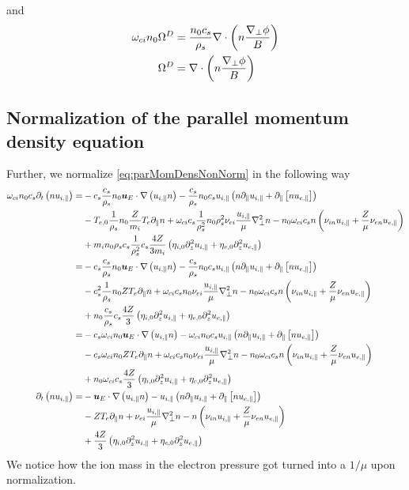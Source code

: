 %
and
%
\begin{align*}
    \omega_{ci}n_0\Omega^D &= \frac{n_0 c_s}{\rho_s}\nabla\cdot\left(n\frac{\nabla_\perp\phi}{B}\right)\\
    \Omega^D &= \nabla\cdot\left(n\frac{\nabla_\perp\phi}{B}\right)
\end{align*}
%

\subsection{Normalization of the parallel momentum density equation}
%
Further, we normalize \cref{eq:parMomDensNonNorm} in the following way
%
\begin{align*}
    \omega_{ci}n_0c_s \partial_t\left( n u_{i,\|}\right)
 =&
 - c_s\frac{c_s}{\rho_s}n_0
  \boldsymbol{u}_E \cdot \nabla\left( u_{i,\|} n \right)
 - \frac{c_s}{\rho_s}n_0c_s
    u_{i, \|}
    \left(
    n \partial_\| u_{i,\|}
    + \partial_\|\left[n u_{e,\|} \right]
    \right)   \\&
    - T_{e,0}\frac{1}{\rho_s}n_0
 \frac{Z}{m_i} T_e \partial_\| n
 + \omega_{ci}c_s\frac{1}{\rho_s^2}n_0\rho_s^2
 \nu_{ei} \frac{u_{i,\|}}{\mu} \nabla_\perp^2 n
 - n_0\omega_{ci}c_s
 n \left(\nu_{i n}u_{i,\|} + \frac{Z}{\mu} \nu_{e n}u_{e,\|}\right)
   \\&
   + m_in_0\rho_sc_s\frac{1}{\rho_s^2}c_s \frac{4Z}{3m_i}\left(
   \eta_{i,0} \partial_z^2 u_{i,\|}
 + \eta_{e,0}\partial_z^2 u_{e,\|}
 \right)
 \\
 =&
 - c_s\frac{c_s}{\rho_s}n_0
  \boldsymbol{u}_E \cdot \nabla\left( u_{i,\|} n \right)
 - \frac{c_s}{\rho_s}n_0c_s
  u_{i, \|}
    \left(
    n \partial_\| u_{i,\|}
    + \partial_\|\left[n u_{e,\|} \right]
    \right)
   \\&
 - c_s^2\frac{1}{\rho_s}n_0
 ZT_e \partial_\| n
 + \omega_{ci}c_sn_0
 \nu_{ei} \frac{u_{i,\|}}{\mu} \nabla_\perp^2 n
 - n_0\omega_{ci}c_s
 n \left(\nu_{i n}u_{i,\|} + \frac{Z}{\mu} \nu_{e n}u_{e,\|}\right)
   \\&
   + n_0\frac{c_s}{\rho_s}c_s\frac{4Z}{3}\left(
   \eta_{i,0} \partial_z^2 u_{i,\|}
 + \eta_{e,0}\partial_z^2 u_{e,\|}
 \right)
 \\
 =&
 - c_s\omega_{ci}n_0
  \boldsymbol{u}_E \cdot \nabla\left( u_{i,\|} n \right)
 - \omega_{ci}n_0c_s
  u_{i, \|}
    \left(
    n \partial_\| u_{i,\|}
    + \partial_\|\left[n u_{e,\|} \right]
    \right)
    \\&
 - c_s\omega_{ci}n_0Z
 T_e \partial_\| n
 + \omega_{ci}c_sn_0
 \nu_{ei} \frac{u_{i,\|}}{\mu} \nabla_\perp^2 n
 - n_0\omega_{ci}c_s
 n \left(\nu_{i n}u_{i,\|} + \frac{Z}{\mu} \nu_{e n}u_{e,\|}\right)
   \\&
   + n_0\omega_{ci}c_s\frac{4Z}{3}\left(\eta_{i,0} \partial_z^2 u_{i,\|}
 + \eta_{e,0}\partial_z^2 u_{e,\|}\right)
 \\
  \partial_t\left( n u_{i,\|}\right)
 =&
 -  \boldsymbol{u}_E \cdot \nabla\left( u_{i,\|} n \right)
 - u_{i, \|}
    \left(
    n \partial_\| u_{i,\|}
    + \partial_\|\left[n u_{e,\|} \right]
    \right)
   \\&
 - ZT_e \partial_\| n
 + \nu_{ei} \frac{u_{i,\|}}{\mu} \nabla_\perp^2 n
 - n \left(\nu_{i n}u_{i,\|} + \frac{Z}{\mu} \nu_{e n}u_{e,\|}\right)
   \\&
   + \frac{4Z}{3}\left(\eta_{i,0} \partial_z^2 u_{i,\|}
 + \eta_{e,0}\partial_z^2 u_{e,\|}\right)
\end{align*}
%
We notice how the ion mass in the electron pressure got turned into a $1/\mu$ upon normalization.

